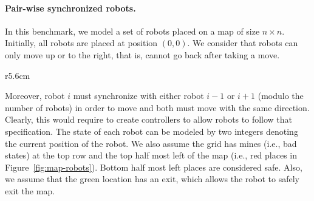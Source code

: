 \paragraph{Pair-wise synchronized robots.} 
In this benchmark, we model a set of robots placed on a map of size $n \times n$. Initially, all robots are placed at position $(0, 0)$. We consider that robots can only move up or to the right, that is, cannot go back after taking a move.
%
\begin{wrapfigure}{r}{5.6cm}
\vspace*{-0.6cm}
\centering
{}
\vspace*{-0.5cm}
\caption{Map of pair-wise synchronizing robots}
\vspace*{-0.5cm}
\label{fig:map-robots}
\end{wrapfigure}
%
Moreover, robot $i$ must synchronize with either robot $i-1$ or $i+1$ (modulo the number of robots) in order to move and both must move with the same direction. Clearly, this would require to create controllers to allow robots to follow that specification. The state of each robot can be modeled by two integers denoting the current position of the robot. We also assume the grid has mines (i.e., bad states) at the top row and the top half most left of the map (i.e., red places in Figure~\ref{fig:map-robots}). 
%
Bottom half most left places are considered safe. Also, we assume that the green location has an exit, which allows the robot to safely exit the map.   

